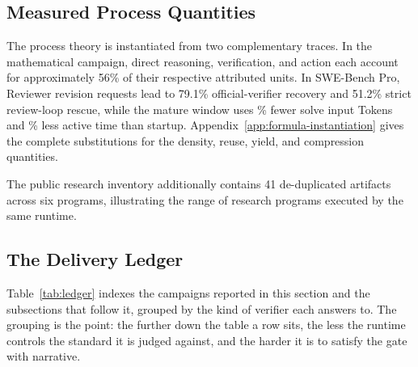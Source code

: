 \subsection{Measured Process Quantities}

The process theory is instantiated from two complementary traces. In the
mathematical campaign, direct reasoning, verification, and action each account for
approximately 56\% of their respective attributed units. In SWE-Bench Pro, Reviewer
revision requests lead to 79.1\% official-verifier recovery and 51.2\% strict
review-loop rescue, while the mature window uses \SWEProTokenReduction\% fewer solve input Tokens and
\SWEProTimeReduction\% less active time than startup. Appendix~\ref{app:formula-instantiation} gives
the complete substitutions for the density, reuse, yield, and compression
quantities.

The public research inventory additionally contains 41 de-duplicated artifacts
across six programs, illustrating the range of research programs executed by the
same runtime.

\subsection{The Delivery Ledger}
\label{sec:ledger}

Table~\ref{tab:ledger} indexes the campaigns reported in this section and the
subsections that follow it, grouped by the kind of verifier each answers to. The
grouping is the point: the further down the table a row sits, the less the runtime
controls the standard it is judged against, and the harder it is to satisfy the gate
with narrative.

